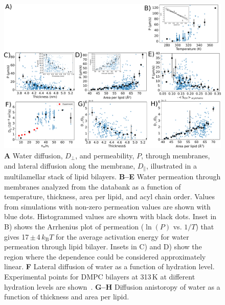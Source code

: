\documentclass[fleqn,10pt]{wlscirep}
\begin{document}
\begin{figure}[tb]
    \centering
    \includegraphics[width=\linewidth]{Figures/permeation2.pdf}
    \caption{\textbf{A} Water diffusion, $D_\perp$, and permeability, $P$, through membranes, and lateral diffusion along the membrane, $D_\parallel$, illustrated in a multilamellar stack of lipid bilayers. 
    \textbf{B--E} Water permeation through membranes analyzed from the databank as a function of temperature, thickness, area per lipid, and acyl chain order. Values from simulations with non-zero permeation values are shown with blue dots. Histogrammed values are shown with black dots. Inset in B) shows the Arrhenius plot of permeation ($\ln(P)$ vs. $1/T$) that gives 17\,$\pm$\,4\,$k_\mathrm{B}T$ for the average activation energy for water permeation through lipid bilayer. Insets in C) and D) show the region where the dependence could be considered approximately linear.
    \textbf{F} Lateral diffusion of water as a function of hydration level. Experimental points for DMPC bilayers at 313\,K at different hydration levels are shown~\cite{rudakova04}.
    \textbf{G--H} Diffusion anistoropy of water as a function of thickness and area per lipid. }
    \label{fig:permeability}
\end{figure}
\end{document}
